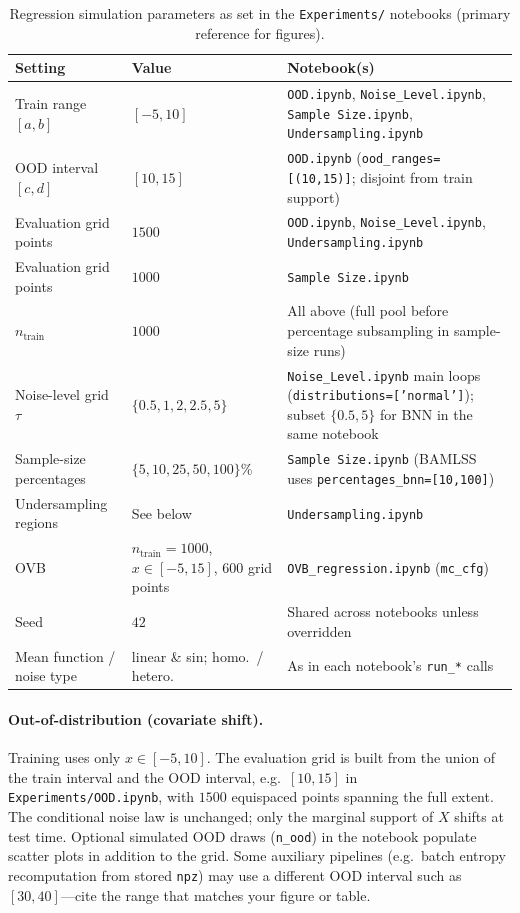 \begin{table}[htbp]
  \centering
  \caption{Regression simulation parameters as set in the \texttt{Experiments/} notebooks (primary reference for figures).}
  \label{tab:baseline-sim-params}
  \begin{tabular}{llp{6.5cm}}
    \toprule
    Setting & Value & Notebook(s) \\
    \midrule
    Train range $[a,b]$ & $[-5,10]$ & \texttt{OOD.ipynb}, \texttt{Noise\_Level.ipynb}, \texttt{Sample Size.ipynb}, \texttt{Undersampling.ipynb} \\
    OOD interval $[c,d]$ & $[10,15]$ & \texttt{OOD.ipynb} (\texttt{ood\_ranges=[(10,15)]}; disjoint from train support) \\
    Evaluation grid points & $1500$ & \texttt{OOD.ipynb}, \texttt{Noise\_Level.ipynb}, \texttt{Undersampling.ipynb} \\
    Evaluation grid points & $1000$ & \texttt{Sample Size.ipynb} \\
    $n_{\mathrm{train}}$ & $1000$ & All above (full pool before percentage subsampling in sample-size runs) \\
    Noise-level grid $\tau$ & $\{0.5,1,2,2.5,5\}$ & \texttt{Noise\_Level.ipynb} main loops (\texttt{distributions=['normal']}); subset $\{0.5,5\}$ for BNN in the same notebook \\
    Sample-size percentages & $\{5,10,25,50,100\}\%$ & \texttt{Sample Size.ipynb} (BAMLSS uses \texttt{percentages\_bnn=[10,100]}) \\
    Undersampling regions & See below & \texttt{Undersampling.ipynb} \\
    OVB & $n_{\mathrm{train}}=1000$, $x\in[-5,15]$, $600$ grid points & \texttt{OVB\_regression.ipynb} (\texttt{mc\_cfg}) \\
    Seed & $42$ & Shared across notebooks unless overridden \\
    Mean function / noise type & linear \& sin; homo.\ / hetero.\ & As in each notebook's \texttt{run\_*} calls \\
    \bottomrule
  \end{tabular}
\end{table}

\paragraph{Out-of-distribution (covariate shift).}
Training uses only $x\in[-5,10]$. The evaluation grid is built from the union of the train interval and the OOD interval, e.g.\ $[10,15]$ in \texttt{Experiments/OOD.ipynb}, with $1500$ equispaced points spanning the full extent. The conditional noise law is unchanged; only the marginal support of $X$ shifts at test time. Optional simulated OOD draws (\texttt{n\_ood}) in the notebook populate scatter plots in addition to the grid. Some auxiliary pipelines (e.g.\ batch entropy recomputation from stored \texttt{npz}) may use a different OOD interval such as $[30,40]$---cite the range that matches your figure or table.

